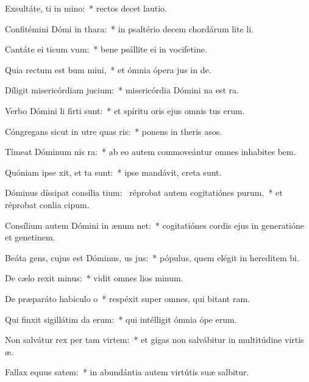 \item Exsultáte, ti in mino:~* rectos decet lautio.
\item Confitémini Dómi in thara:~* in psaltério decem chordárum lite li.
\item Cantáte ei ticum vum:~* bene psállite ei in vocifetine.
\item Quia rectum est bum mini,~* et ómnia ópera jus in de.
\item Díligit misericórdiam  jucium:~* misericórdia Dómini na est ra.
\item Verbo Dómini li firti sunt:~* et spíritu oris ejus omnis tus erum.
\item Cóngregans sicut in utre quas ris:~* ponens in theris asos.
\item Tímeat Dóminum nis ra:~* ab eo autem commoveántur omnes inhabites bem.
\item Quóniam ipse xit, et ta sunt:~* ipse mandávit,  creta sunt.
\item Dóminus díssipat consília tium:~\pscross{} réprobat autem cogitatiónes purum,~* et réprobat conlia cipum.
\item Consílium autem Dómini in ænum net:~* cogitatiónes cordis ejus in generatióne et genetinem.
\item Beáta gens, cujus est Dóminus, us jus:~* pópulus, quem elégit in hereditem bi.
\item De cælo rexit minus:~* vidit omnes lios minum.
\item De præparáto habiculo o~* respéxit super omnes, qui bitant ram.
\item Qui finxit sigillátim da erum:~* qui intélligit ómnia ópe erum.
\item Non salvátur rex per tam virtem:~* et gigas non salvábitur in multitúdine virtis æ.
\item Fallax equus  satem:~* in abundántia autem virtútis suæ  salbitur.
